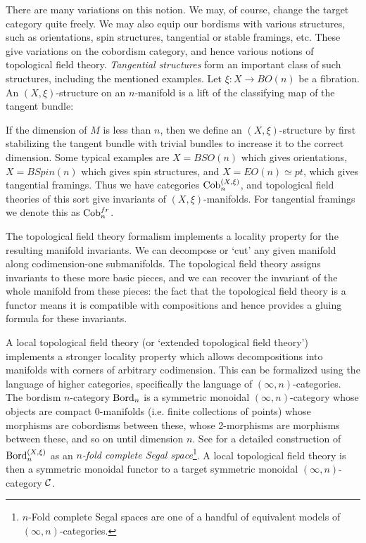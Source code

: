 \documentclass{amsart}
\begin{document}
There are many variations on this notion. We may, of course, change the target category quite freely. We may also equip our bordisms with various structures, such as orientations, spin structures, tangential or stable framings, etc. These give variations on the cobordism category, and hence various notions of topological field theory. {\em Tangential structures} form an important class of such structures, including the mentioned examples. Let $\xi: X \to BO(n)$ be a fibration. An $(X, \xi)$-structure on an $n$-manifold is a lift of the classifying map of the tangent bundle:
\begin{center}
\end{center}
If the dimension of $M$ is less than $n$, then we define an $(X,\xi)$-structure by first stabilizing the tangent bundle with trivial bundles to increase it to the correct dimension. Some typical examples are $X = BSO(n)$ which gives orientations, $X = BSpin(n)$ which gives spin structures, and $X = EO(n) \simeq pt$, which gives tangential framings.  
Thus we have categories $\mathrm{Cob}_n^{(X, \xi)}$, and topological field theories of this sort give invariants of $(X,\xi)$-manifolds. For tangential framings we denote this as $\mathrm{Cob}_n^{fr}$.

The topological field theory formalism implements a locality property for the resulting manifold invariants. We can decompose or `cut' any given manifold along codimension-one submanifolds. The topological field theory assigns invariants to these more basic pieces, and we can recover the invariant of the whole manifold from these pieces: the fact that the topological field theory is a functor means it is compatible with compositions and hence provides a gluing formula for these invariants.  

A local topological field theory (or `extended topological field theory') implements a stronger locality property which allows decompositions into manifolds with corners of arbitrary codimension. This can be formalized using the language of higher categories, specifically the language of $(\infty,n)$-categories. The bordism $n$-category $\mathrm{Bord}_n$ is a symmetric monoidal $(\infty,n)$-category whose objects are compact 0-manifolds (i.e. finite collections of points) whose morphisms are cobordisms between these, whose 2-morphisms are morphisms between these, and so on until dimension $n$. See \cite[\S 2.2]{lurie-ch} for a detailed construction of $\mathrm{Bord}_n^{(X,\xi)}$ as an {\em $n$-fold complete Segal space}\footnote{$n$-Fold complete Segal spaces are one of a handful of equivalent models of $(\infty,n)$-categories.}.
 A local topological field theory is then a symmetric monoidal functor to a target symmetric monoidal $(\infty,n)$-category $\mathcal C$. 
\end{document}
